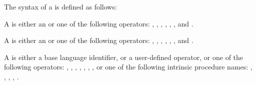 \syntax
The syntax of a  is defined as follows:

\begin{cspecific}
A  is either an  or one 
of the following operators: \code{+}, \code{-}, \code{*}, \code{&},
\code{|}, \code{^}, \code{&&} and \code{||}.
\end{cspecific} 

\begin{cppspecific}
A  is either an  or one 
of the following operators: \code{+}, \code{-}, \code{*}, \code{&},
\code{|}, \code{^}, \code{&&} and \code{||}.
\end{cppspecific}

\begin{fortranspecific}
A  is either a base language identifier, or 
a user-defined operator, or one of the following operators: \code{+},
\code{-}, \code{*}, , , , ,
or one of the following intrinsic procedure names: , ,
, , .
\end{fortranspecific}

